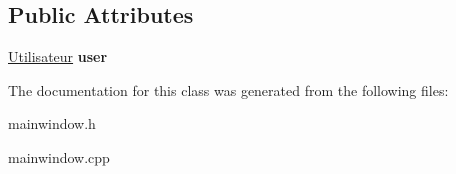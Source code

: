 \subsection*{Public Attributes}
\begin{DoxyCompactItemize}
\item 
\mbox{\label{class_main_window_a6d37265ebccf5d8891e033be9348133e}} 
\mbox{\hyperlink{class_utilisateur}{Utilisateur}} {\bfseries user}
\end{DoxyCompactItemize}


The documentation for this class was generated from the following files\+:\begin{DoxyCompactItemize}
\item 
mainwindow.\+h\item 
mainwindow.\+cpp\end{DoxyCompactItemize}
